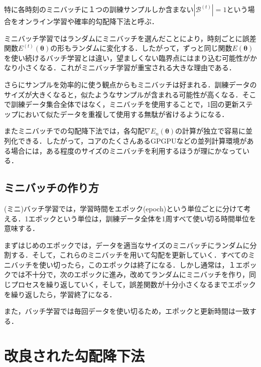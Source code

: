 \documentclass[a4paper,11pt]{jsreport}
\begin{document}
特に各時刻のミニバッチに１つの訓練サンプルしか含まない$|\mathcal{B}^{(t)}|=1$という場合をオンライン学習や確率的勾配降下法と呼ぶ．\par
ミニバッチ学習ではランダムにミニバッチを選んだことにより，時刻ごとに誤差関数$E^{(t)}(\bm{\theta})$の形もランダムに変化する．したがって，ずっと同じ関数$E(\bm{\theta})$を使い続けるバッチ学習とは違い，望ましくない臨界点にはまり込む可能性がかなり小さくなる．これがミニバッチ学習が重宝される大きな理由である．\par
さらにサンプルを効率的に使う観点からもミニバッチは好まれる．訓練データのサイズが大きくなると，似たようなサンプルが含まれる可能性が高くなる．そこで訓練データ集合全体ではなく，ミニバッチを使用することで，1回の更新ステップにおいて似たデータを重複して使用する無駄が省けるようになる．\par
またミニバッチでの勾配降下法では，各勾配$\nabla E_n(\bm{\theta})$の計算が独立で容易に並列化できる．したがって，コアのたくさんあるGPGPUなどの並列計算環境がある場合には，ある程度のサイズのミニバッチを利用するほうが理にかなっている．

\subsection{ミニバッチの作り方}
(ミニ)バッチ学習では，学習時間をエポック(epoch)という単位ごとに分けて考える．1エポックという単位は，訓練データ全体を1周すべて使い切る時間単位を意味する．\par
まずはじめのエポックでは，データを適当なサイズのミニバッチにランダムに分割する．そして，これらのミニバッチを用いて勾配を更新していく．すべてのミニバッチを使い切ったら，このエポックは終了になる．しかし通常は，１エポックでは不十分で，次のエポックに進み，改めてランダムにミニバッチを作り，同じプロセスを繰り返していく，そして，誤差関数が十分小さくなるまでエポックを繰り返したら，学習終了になる．\par
また，バッチ学習では毎回データを使い切るため，エポックと更新時間は一致する．

\section{改良された勾配降下法}
\end{document}
